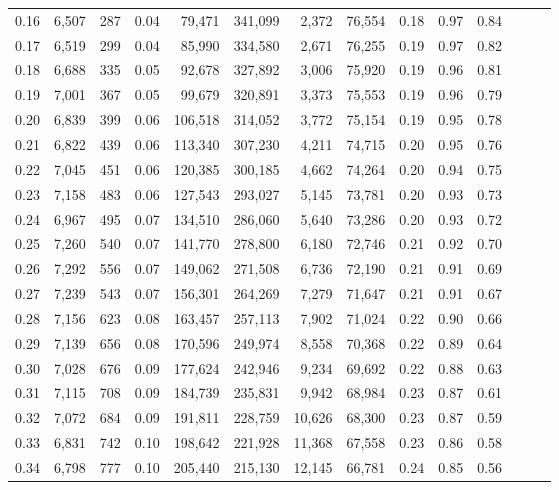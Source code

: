 \begin{tabular}{rrrrrrrrrrrrrr}
0.16 &  6,507 &    287 &  0.04 &   79,471 &  341,099 &   2,372 &  76,554 &  0.18 &  0.97 &      0.84 \\
0.17 &  6,519 &    299 &  0.04 &   85,990 &  334,580 &   2,671 &  76,255 &  0.19 &  0.97 &      0.82 \\
0.18 &  6,688 &    335 &  0.05 &   92,678 &  327,892 &   3,006 &  75,920 &  0.19 &  0.96 &      0.81 \\
0.19 &  7,001 &    367 &  0.05 &   99,679 &  320,891 &   3,373 &  75,553 &  0.19 &  0.96 &      0.79 \\
0.20 &  6,839 &    399 &  0.06 &  106,518 &  314,052 &   3,772 &  75,154 &  0.19 &  0.95 &      0.78 \\
0.21 &  6,822 &    439 &  0.06 &  113,340 &  307,230 &   4,211 &  74,715 &  0.20 &  0.95 &      0.76 \\
0.22 &  7,045 &    451 &  0.06 &  120,385 &  300,185 &   4,662 &  74,264 &  0.20 &  0.94 &      0.75 \\
0.23 &  7,158 &    483 &  0.06 &  127,543 &  293,027 &   5,145 &  73,781 &  0.20 &  0.93 &      0.73 \\
0.24 &  6,967 &    495 &  0.07 &  134,510 &  286,060 &   5,640 &  73,286 &  0.20 &  0.93 &      0.72 \\
0.25 &  7,260 &    540 &  0.07 &  141,770 &  278,800 &   6,180 &  72,746 &  0.21 &  0.92 &      0.70 \\
0.26 &  7,292 &    556 &  0.07 &  149,062 &  271,508 &   6,736 &  72,190 &  0.21 &  0.91 &      0.69 \\
0.27 &  7,239 &    543 &  0.07 &  156,301 &  264,269 &   7,279 &  71,647 &  0.21 &  0.91 &      0.67 \\
0.28 &  7,156 &    623 &  0.08 &  163,457 &  257,113 &   7,902 &  71,024 &  0.22 &  0.90 &      0.66 \\
0.29 &  7,139 &    656 &  0.08 &  170,596 &  249,974 &   8,558 &  70,368 &  0.22 &  0.89 &      0.64 \\
0.30 &  7,028 &    676 &  0.09 &  177,624 &  242,946 &   9,234 &  69,692 &  0.22 &  0.88 &      0.63 \\
0.31 &  7,115 &    708 &  0.09 &  184,739 &  235,831 &   9,942 &  68,984 &  0.23 &  0.87 &      0.61 \\
0.32 &  7,072 &    684 &  0.09 &  191,811 &  228,759 &  10,626 &  68,300 &  0.23 &  0.87 &      0.59 \\
0.33 &  6,831 &    742 &  0.10 &  198,642 &  221,928 &  11,368 &  67,558 &  0.23 &  0.86 &      0.58 \\
0.34 &  6,798 &    777 &  0.10 &  205,440 &  215,130 &  12,145 &  66,781 &  0.24 &  0.85 &      0.56 \\

\end{tabular}
